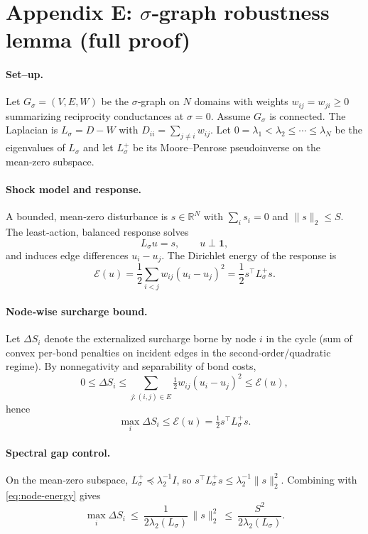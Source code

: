 \documentclass[11pt]{article}
\begin{document}
\section{Appendix E: $\sigma$‑graph robustness lemma (full proof)}

\paragraph{Set–up.}
Let $G_\sigma=(V,E,W)$ be the $\sigma$‑graph on $N$ domains with weights $w_{ij}=w_{ji}\ge 0$ summarizing reciprocity conductances at $\sigma=0$. Assume $G_\sigma$ is connected. The Laplacian is $L_\sigma=D-W$ with $D_{ii}=\sum_{j\neq i} w_{ij}$. Let $0=\lambda_1<\lambda_2\le \cdots\le \lambda_N$ be the eigenvalues of $L_\sigma$ and let $L_\sigma^{+}$ be its Moore–Penrose pseudoinverse on the mean‑zero subspace.

\paragraph{Shock model and response.}
A bounded, mean‑zero disturbance is $s\in\mathbb{R}^N$ with $\sum_i s_i=0$ and $\|s\|_2\le S$. The least‑action, balanced response solves
\[
L_\sigma u=s,\qquad u\perp \mathbf{1},
\]
and induces edge differences $u_i-u_j$. The Dirichlet energy of the response is
\[
\mathcal{E}(u)=\frac12\sum_{i<j} w_{ij}(u_i-u_j)^2=\frac12 s^\top L_\sigma^{+} s.
\]

\paragraph{Node‑wise surcharge bound.}
Let $\Delta S_i$ denote the externalized surcharge borne by node $i$ in the cycle (sum of convex per‑bond penalties on incident edges in the second‑order/quadratic regime). By nonnegativity and separability of bond costs,
\[
0\le \Delta S_i \le \sum_{j: (i,j)\in E} \tfrac12 w_{ij}(u_i-u_j)^2 \le \mathcal{E}(u),
\]
hence
\begin{equation}
\max_i \Delta S_i \le \mathcal{E}(u)=\tfrac12 s^\top L_\sigma^{+} s.
\label{eq:node-energy}
\end{equation}

\paragraph{Spectral gap control.}
On the mean‑zero subspace, $L_\sigma^{+}\preceq \lambda_2^{-1} I$, so $s^\top L_\sigma^{+} s \le \lambda_2^{-1}\|s\|_2^2$. Combining with \eqref{eq:node-energy} gives
\begin{equation}
\max_i \Delta S_i \ \le\ \frac{1}{2\lambda_2(L_\sigma)}\,\|s\|_2^2\ \le\ \frac{S^2}{2\lambda_2(L_\sigma)}.
\label{eq:max-bound}
\end{equation}
\end{document}
